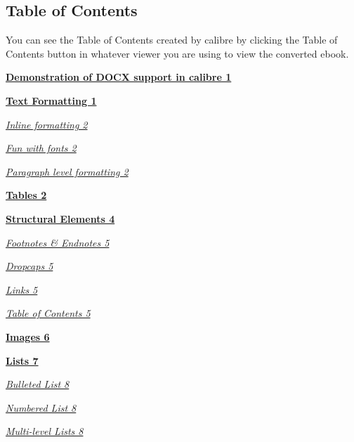 \documentclass[\officeparserdriver 12pt]{article}
\begin{document}
\subsection[{Table of Contents}]{\protect\textcolor{hex4F81BD}{Table of Contents}}\label{table-of-contents}

You can see the Table of Contents created by calibre by clicking the Table of Contents button in whatever viewer you are using to view the converted ebook.

\hyperref[demonstration-of-docx-support-in-calibre]{\textbf{{\fontsize{10pt}{12pt}\selectfont Demonstration of DOCX support in calibre 1}}}

\hyperref[text-formatting]{\textbf{{\fontsize{10pt}{12pt}\selectfont Text Formatting 1}}}

\hyperref[inline-formatting]{\textit{{\fontsize{10pt}{12pt}\selectfont Inline formatting 2}}}

\hyperref[fun-with-fonts]{\textit{{\fontsize{10pt}{12pt}\selectfont Fun with fonts 2}}}

\hyperref[paragraph-level-formatting]{\textit{{\fontsize{10pt}{12pt}\selectfont Paragraph level formatting 2}}}

\hyperref[tables]{\textbf{{\fontsize{10pt}{12pt}\selectfont Tables 2}}}

\hyperref[structural-elements]{\textbf{{\fontsize{10pt}{12pt}\selectfont Structural Elements 4}}}

\hyperref[footnotes-endnotes]{\textit{{\fontsize{10pt}{12pt}\selectfont Footnotes \& Endnotes 5}}}

\hyperref[dropcaps]{\textit{{\fontsize{10pt}{12pt}\selectfont Dropcaps 5}}}

\hyperref[links]{\textit{{\fontsize{10pt}{12pt}\selectfont Links 5}}}

\hyperref[table-of-contents]{\textit{{\fontsize{10pt}{12pt}\selectfont Table of Contents 5}}}

\clearpage

\hyperref[images]{\textbf{{\fontsize{10pt}{12pt}\selectfont Images 6}}}

\hyperref[images]{\textbf{{\fontsize{10pt}{12pt}\selectfont Lists 7}}}

\hyperref[bulleted-list]{\textit{{\fontsize{10pt}{12pt}\selectfont Bulleted List 8}}}

\hyperref[numbered-list]{\textit{{\fontsize{10pt}{12pt}\selectfont Numbered List 8}}}

\hyperref[multi-level-lists]{\textit{{\fontsize{10pt}{12pt}\selectfont Multi-level Lists 8}}}
\end{document}
